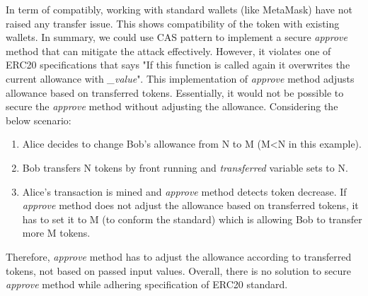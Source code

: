 \noindent In term of compatibly, working with standard wallets (like MetaMask) have not raised any transfer issue. This shows compatibility of the token with existing wallets. In summary, we could use CAS pattern to implement a secure \textit{approve} method that can mitigate the attack effectively. However, it violates one of ERC20 specifications that says "If this function is called again it overwrites the current allowance with \textit{\_value}". This implementation of \textit{approve} method adjusts allowance based on transferred tokens. Essentially, it would not be possible to secure the \textit{approve} method without adjusting the allowance. Considering the below scenario:
\begin{enumerate}
	\item Alice decides to change Bob's allowance from N to M (M<N in this example).
	\item Bob transfers N tokens by front running and \textit{transferred} variable sets to N.
	\item Alice's transaction is mined and \textit{approve} method detects token decrease. If \textit{approve} method does not adjust the allowance based on transferred tokens, it has to set it to M (to conform the standard) which is allowing Bob to transfer more M tokens.
\end{enumerate}
Therefore, \textit{approve} method has to adjust the allowance according to transferred tokens, not based on passed input values. Overall, there is no solution to secure \textit{approve} method while adhering specification of ERC20 standard.

